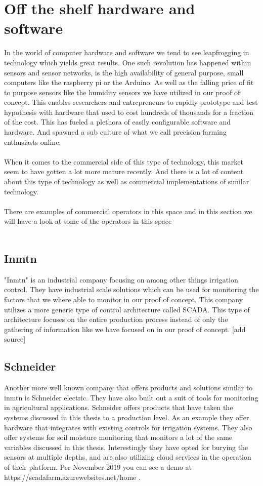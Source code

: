 \documentclass[]{uiophd}
\begin{document}
\section{Off the shelf hardware and software}
In the world of computer hardware and software we tend to see leapfrogging in technology which yields great results. One such revolution has happened within sensors and sensor networks, is the high availability of general purpose, small computers like the raspberry pi or the Arduino. As well as the falling price of fit to purpose sensors like the humidity sensors we have utilized in our proof of concept. This enables researchers and entrepreneurs to rapidly prototype and test hypothesis with hardware that used to cost hundreds of thousands for a fraction of the cost. This has fueled a plethora of easily configurable software and hardware. And spawned a sub culture of what we call precision farming enthusiasts online. 
\\\\
When it comes to the commercial side of this type of technology, this market seem to have gotten a lot more mature recently. And there is a lot of content about this type of technology as well as commercial implementations of similar technology.
\\\\
There are examples of commercial operators in this space and in this section we will have a look at some of the operators in this space
\\\\
\subsection{Inmtn}
"Inmtn" is an industrial company focusing on among other things irrigation control. They have industrial scale solutions which can be used for monitoring the factors that we where able to monitor in our proof of concept. This company utilizes a more generic type of control architecture called SCADA. This type of architecture focuses on the entire production process instead of only the gathering of information like we have focused on in our proof of concept. [add source]

\subsection{Schneider}
Another more well known company that offers products and solutions similar to inmtn is Schneider electric. They have also built out a suit of tools for monitoring in agricultural applications. Schneider offers products that have taken the systems discussed in this thesis to a production level. As an example they offer hardware that integrates with existing controls for irrigation systems. They also offer systems for soil moisture monitoring that monitors a lot of the same variables discussed in this thesis. Interestingly they have opted for burying the sensors at multiple depths, and are also utilizing cloud services in the operation of their platform. Per November 2019 you can see a demo at https://scadafarm.azurewebsites.net/home . 
\end{document}
